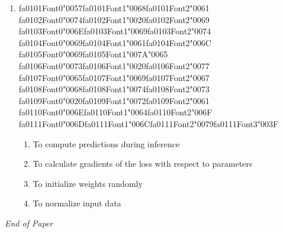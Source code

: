 \documentclass[12pt]{article}
\begin{document}
\begin{enumerate}[label=Q\arabic*.]
\begin{enumerate}[label=(\Alph*)]
    \item $(n_0 \times n_1)$
    \item $(n_1 \times n_0)$
    \item $(n_0 \times 1)$
    \item $(1 \times n_1)$
\end{enumerate}
\item {\csname fa0101Font0\endcsname\char"0057}{\csname fa0101Font1\endcsname\char"0068}{\csname fa0101Font2\endcsname\char"0061} {\csname fa0102Font0\endcsname\char"0074}{\csname fa0102Font1\endcsname\char"0020}{\csname fa0102Font2\endcsname\char"0069} {\csname fa0103Font0\endcsname\char"006E}{\csname fa0103Font1\endcsname\char"0069}{\csname fa0103Font2\endcsname\char"0074} {\csname fa0104Font0\endcsname\char"0069}{\csname fa0104Font1\endcsname\char"0061}{\csname fa0104Font2\endcsname\char"006C} {\csname fa0105Font0\endcsname\char"0069}{\csname fa0105Font1\endcsname\char"007A}{\char"0065} {\csname fa0106Font0\endcsname\char"0073}{\csname fa0106Font1\endcsname\char"0020}{\csname fa0106Font2\endcsname\char"0077} {\csname fa0107Font0\endcsname\char"0065}{\csname fa0107Font1\endcsname\char"0069}{\csname fa0107Font2\endcsname\char"0067} {\csname fa0108Font0\endcsname\char"0068}{\csname fa0108Font1\endcsname\char"0074}{\csname fa0108Font2\endcsname\char"0073} {\csname fa0109Font0\endcsname\char"0020}{\csname fa0109Font1\endcsname\char"0072}{\csname fa0109Font2\endcsname\char"0061} {\csname fa0110Font0\endcsname\char"006E}{\csname fa0110Font1\endcsname\char"0064}{\csname fa0110Font2\endcsname\char"006F} {\csname fa0111Font0\endcsname\char"006D}{\csname fa0111Font1\endcsname\char"006C}{\csname fa0111Font2\endcsname\char"0079}{\csname fa0111Font3\endcsname\char"003F}
\begin{enumerate}[label=(\Alph*)]
    \item To compute predictions during inference
    \item To calculate gradients of the loss with respect to parameters
    \item To initialize weights randomly
    \item To normalize input data
\end{enumerate}
\end{enumerate}

\vfill
\noindent\textit{End of Paper}
\end{document}
